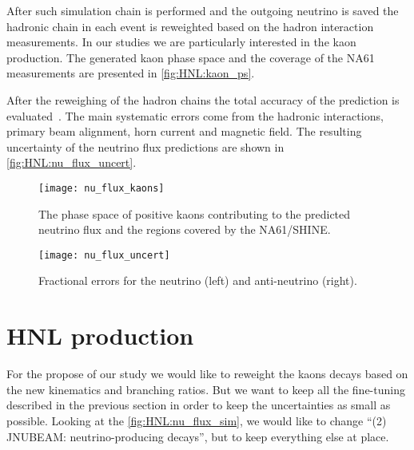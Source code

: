 \documentclass[../main.tex]{subfiles}
\begin{document}
After such simulation chain is performed and the outgoing neutrino is saved the hadronic chain in each event is reweighted based on the hadron interaction measurements. In our studies we are particularly interested in the kaon production. The generated kaon phase space and the coverage of the NA61 measurements are presented in \autoref{fig:HNL:kaon_ps}.

After the reweighing of the hadron chains the total accuracy of the prediction is evaluated~\cite{Abe2013}. The main systematic errors come from the hadronic interactions, primary beam alignment, horn current and magnetic field. The resulting uncertainty of the neutrino flux predictions are shown in \autoref{fig:HNL:nu_flux_uncert}.

\begin{figure}[!ht]
    \begin{minipage}[!ht]{0.49\linewidth}
        \centering
        \texttt{[image: nu\_flux\_kaons]}
        \caption{The phase space of positive kaons contributing to the predicted neutrino flux and the regions covered by the NA61/SHINE.}
        \label{fig:HNL:kaon_ps}
    \end{minipage}
    \hfill
    \begin{minipage}[!ht]{0.49\linewidth}
        \centering
        \texttt{[image: nu\_flux\_uncert]}
        \caption{Fractional errors for the neutrino (left) and anti-neutrino (right).}
        \label{fig:HNL:nu_flux_uncert}
    \end{minipage}
\end{figure}


\section{HNL production}

For the propose of our study we would like to reweight the kaons decays based on the new kinematics and branching ratios. But we want to keep all the fine-tuning described in the previous section in order to keep the uncertainties as small as possible. Looking at the \autoref{fig:HNL:nu_flux_sim}, we would like to change ``(2) JNUBEAM: neutrino-producing decays'', but to keep everything else at place.
\end{document}

